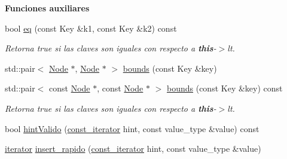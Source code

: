 \begin{Indent}{\bf \-Funciones auxiliares}\par
\begin{DoxyCompactItemize}
\item 
bool \hyperlink{classaed2_1_1map_ab45cb28bb215cd229383d88b96b3f624_ab45cb28bb215cd229383d88b96b3f624}{eq} (const \-Key \&k1, const \-Key \&k2) const 
\begin{DoxyCompactList}\small\item\em \-Retorna true si las claves son iguales con respecto a {\bfseries this}-\/$>$lt. \end{DoxyCompactList}\item 
std\-::pair$<$ \hyperlink{structaed2_1_1map_1_1Node}{\-Node} $\ast$, \hyperlink{structaed2_1_1map_1_1Node}{\-Node} $\ast$ $>$ \hyperlink{classaed2_1_1map_aa079b9390f988f97be26fd51ed44a2c9_aa079b9390f988f97be26fd51ed44a2c9}{bounds} (const \-Key \&key)
\item 
std\-::pair$<$ const \hyperlink{structaed2_1_1map_1_1Node}{\-Node} $\ast$, const \*
\hyperlink{structaed2_1_1map_1_1Node}{\-Node} $\ast$ $>$ \hyperlink{classaed2_1_1map_a4d903414b3f1f1e6f785342bb3900572_a4d903414b3f1f1e6f785342bb3900572}{bounds} (const \-Key \&key) const 
\begin{DoxyCompactList}\small\item\em \-Retorna true si las claves son iguales con respecto a {\bfseries this}-\/$>$lt. \end{DoxyCompactList}\item 
bool \hyperlink{classaed2_1_1map_a45b04533e9acf27438813ab4a2604443_a45b04533e9acf27438813ab4a2604443}{hint\-Valido} (\hyperlink{classaed2_1_1map_1_1const__iterator}{const\-\_\-iterator} hint, const value\-\_\-type \&value) const 
\item 
\hyperlink{classaed2_1_1map_1_1iterator}{iterator} \hyperlink{classaed2_1_1map_a4b4f1e65ee9aeccee4046d53fd5fd8a4_a4b4f1e65ee9aeccee4046d53fd5fd8a4}{insert\-\_\-rapido} (\hyperlink{classaed2_1_1map_1_1const__iterator}{const\-\_\-iterator} hint, const value\-\_\-type \&value)
\end{DoxyCompactItemize}
\end{Indent}
